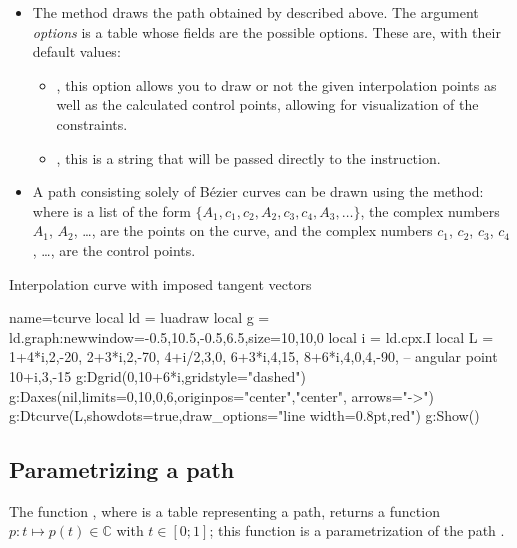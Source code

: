 \begin{itemize}
Two consecutive points will be connected by a Bézier curve; the function calculates the control points to obtain the desired tangent vectors.

    \item The method  draws the path obtained by  described above. The argument \emph{options} is a table whose fields are the possible options. These are, with their default values:
    \begin{itemize}
        \item {}, this option allows you to draw or not the given interpolation points as well as the calculated control points, allowing for visualization of the constraints.
        \item {}, this is a string that will be passed directly to the \drawcmd instruction.
    \end{itemize}
    
\item A path consisting solely of Bézier curves can be drawn using the method:
where  is a list of the form $\{A_1,c_1,c_2,A_2,c_3,c_4,A_3,\ldots\}$, the complex numbers $A_1$, $A_2$, \ldots, are the points on the curve, and the complex numbers $c_1$, $c_2$, $c_3$, $c_4$, \ldots, are the control points.    
\end{itemize}    

\begin{demo}{Interpolation curve with imposed tangent vectors}
\begin{luadraw}{name=tcurve}
local ld = luadraw
local g = ld.graph:new{window={-0.5,10.5,-0.5,6.5},size={10,10,0}}
local i = ld.cpx.I
local L = {
1+4*i,{2,-20},
2+3*i,{2,-70},
4+i/2,{3,0},
6+3*i,{4,15},
8+6*i,{4,0,4,-90}, -- angular point
10+i,{3,-15}}
g:Dgrid({0,10+6*i},{gridstyle="dashed"})
g:Daxes(nil,{limits={{0,10},{0,6}},originpos={"center","center"}, arrows="->"})
g:Dtcurve(L,{showdots=true,draw_options="line width=0.8pt,red"})
g:Show()
\end{luadraw}
\end{demo}

\subsection{Parametrizing a path}

The function , where  is a table representing a path, returns a function $p\colon t \mapsto p(t)\in \mathbb C$ with $t\in[0;1]$; this function is a parametrization of the path .

